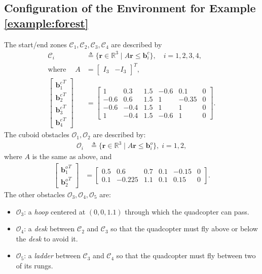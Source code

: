 \documentclass[journal,10pt]{IEEEtran}
\newcommand{\vect}[1]{\boldsymbol{\mathbf{#1}}}
\newcommand{\mat}[1]{\begin{bmatrix} #1 \end{bmatrix}}
\newif\ifdraft
\newcommand{\XX}[1]{\ifdraft{\color{red}[{\bf XX}: #1]}\fi}
\begin{document}
\subsection{Configuration of the Environment for Example \ref{example:forest}}\label{appendix:forest}
The start/end zones $\mathcal{C}_1,\mathcal{C}_2,\mathcal{C}_3,\mathcal{C}_4$ are described by 
\begin{align*}
    \mathcal{C}_i &\triangleq \{\vect{r}\in\mathbb{R}^3\mid A\vect{r}\leq \vect{b}^c_i\},\quad i=1,2,3,4,\\
    \mbox{where}\;\quad A &= \mat{I_3 & -I_3}^T,\\
    \mat{{\vect{b}^c_1}^T\\{\vect{b}^c_2}^T\\{\vect{b}^c_3}^T\\ {\vect{b}^{c}_4}^T} &= \mat{1&0.3&1.5&-0.6&0.1&0\\ -0.6&0.6&1.5&1&-0.35&0\\
    -0.6&-0.4&1.5&1&1&0\\1&-0.4&1.5&-0.6&1&0
    }.
\end{align*}
The cuboid obstacles $\mathcal{O}_1,\mathcal{O}_2$ are described by:
\begin{align*}
    \mathcal{O}_i &\triangleq \{\vect{r}\in\mathbb{R}^3\mid A\vect{r}\leq \vect{b}^o_i\},\;i=1,2,
    \end{align*}
    where $A$ is the same as above, and 
    \begin{align*}
    \mat{{\vect{b}^o_1}^T\\{\vect{b}^o_2}^T} &= \mat{0.5&0.6&0.7&0.1&-0.15&0\\ 0.1&-0.225&1.1&0.1&0.15&0}.
\end{align*}
The other obstacles $\mathcal{O}_3,\mathcal{O}_4,\mathcal{O}_5$ are:
\begin{itemize}
    \item $\mathcal{O}_3$: a \emph{hoop} centered at $(0, 0,1.1)$ through which the quadcopter can pass.
    \item $\mathcal{O}_4$: a \emph{desk} between $\mathcal{C}_2$ and $\mathcal{C}_3$ so that the quadcopter must fly above or below the \emph{desk} to avoid it.
    \item $\mathcal{O}_5$: a \emph{ladder} between $\mathcal{C}_3$ and $\mathcal{C}_4$ so that the quadcopter must fly between two of its rungs.
\end{itemize}
\end{document}
